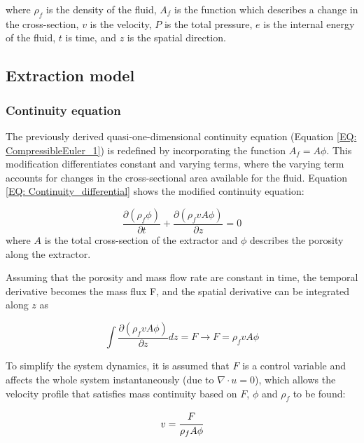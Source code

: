 \documentclass[a4paper,fleqn]{cas-dc}
\begin{document}
where $\rho_f$ is the density of the fluid, $A_f$ is the function which describes a change in the cross-section, $v$ is the velocity, $P$ is the total pressure, $e$ is the internal energy of the fluid, $t$ is time, and $z$ is the spatial direction.

\subsection{Extraction model} \label{CH: Extraction_model}
\subsubsection{Continuity equation} \label{CH: Continuity}

The previously derived quasi-one-dimensional continuity equation (Equation \ref{EQ: CompressibleEuler_1}) is redefined by incorporating the function $A_f = A\phi$. This modification differentiates constant and varying terms, where the varying term accounts for changes in the cross-sectional area available for the fluid. Equation \ref{EQ: Continuity_differential} shows the modified continuity equation:

{\footnotesize
	\begin{equation} \label{EQ: Continuity_differential}
		\frac{\partial (\rho_f \phi)}{\partial t} + \frac{\partial (\rho_f v A\phi)}{\partial z} = 0
	\end{equation}
}
where $A$ is the total cross-section of the extractor and $\phi$ describes the porosity along the extractor.

Assuming that the porosity and mass flow rate are constant in time, the temporal derivative becomes the mass flux F, and the spatial derivative can be integrated along $z$ as

{\footnotesize
	\begin{equation}
		\int \frac{\partial (\rho_f v A \phi )}{\partial z} dz = F \rightarrow F=\rho_f v A\phi
	\end{equation}
}

To simplify the system dynamics, it is assumed that $F$ is a control variable and affects the whole system instantaneously (due to $\nabla \cdot u = 0$), which allows the velocity profile that satisfies mass continuity based on $F$, $\phi$ and $\rho_f$ to be found:

{\footnotesize
	\begin{equation} \label{EQ:Velocity_1}
		v = \cfrac{F}{\rho_f A\phi} 
	\end{equation}
}
\end{document}
